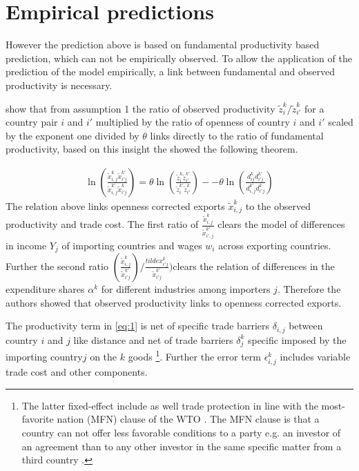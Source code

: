 \section{Empirical predictions}
However the prediction above is based on fundamental productivity based prediction, which can not be empirically observed.  To allow the application of the prediction of the model empirically, a link between fundamental and observed productivity is necessary. \par \textcite{costinot} show that from assumption 1 the ratio of observed productivity $\tilde{z}^k_i / \tilde{z}^k_{i'}$ for a country pair $i$ and $i'$ multiplied by the ratio of openness of country $i$ and $i'$  scaled by the exponent one divided by $\theta$ links directly to the ratio of fundamental productivity, based on this insight the showed the following theorem. \par 
\begin{align} \ln \left( \frac{\tilde{x}_{i,j}^k \tilde{x}^{k'}_{i'j}}{\tilde{x}_{i,j}^{k'} \tilde{x}^{k}_{i'j}} \right) = \theta \ln \left( \frac{\tilde{z}_{i}^k \tilde{z}^{k'}_{i'}}{\tilde{z}_{i}^{k'} \tilde{z}^{k}_{i'}} \right)--\theta \ln \left( \frac{ d_{ij}^k d^{k'}_{i'j}}{d_{i,j}^{k'} {d}^{k}_{i'j}} \right) \end{align}
The relation above links openness corrected exports $\tilde{x}_{i,j}^k$ to the observed productivity and trade cost. The first ratio of  $\frac{\tilde{x}_{i,j}^k} { \tilde{x}_{i', j}^{k'} }$ clears the model of differences in income $Y_j$ of importing countries and wages $w_i$ across exporting countries. Further the second ratio $(\frac{\tilde{x}_{i,j}^k}{\tilde{x}^{k'}_{i'j}})/ \frac{tilde{x}^{k}_{i'j}}{\tilde{x}^{k'}_{i'j}}) $clears the relation of differences in the expenditure shares $\alpha^k$ for different industries among importers $j$. Therefore the authors showed that observed productivity links to openness corrected exports.  \par 
The productivity term in \cref{eq:1} is net of specific trade barriers $\delta_{i,j}$ between country $i$ and $j$ like distance and net of trade barriers $\delta_j^k$ specific imposed by the importing country$j$ on the $k$ goods \footnote{The latter fixed-effect include as well  trade protection in line with the most-favorite nation (MFN) clause of the WTO \parencite{costinot}. The MFN clause is that a country can not offer less favorable conditions to a party e.g. an investor of an agreement than to any other investor in the same specific matter from a third country  \parencite{oecd-mfn}.}. Further the error term $\epsilon^k_{i,j}$ includes variable trade cost and other components.
